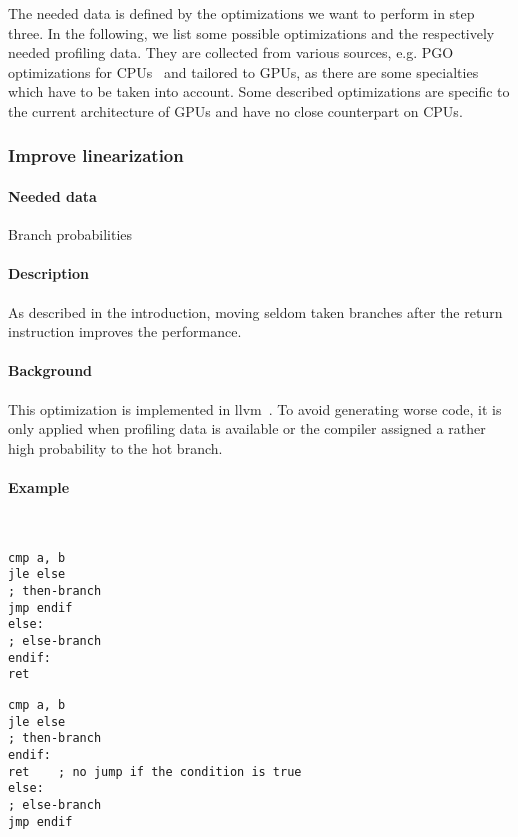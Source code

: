 The needed data is defined by the optimizations we want to perform in step three. In the following, we list some possible optimizations and the respectively needed profiling data. They are collected from various sources, e.g. PGO optimizations for CPUs~\cite{MicrosoftPgo} and tailored to GPUs, as there are some specialties which have to be taken into account. Some described optimizations are specific to the current architecture of GPUs and have no close counterpart on CPUs.

\subsubsection{Improve linearization}
\paragraph{Needed data} Branch probabilities
\paragraph{Description} As described in the introduction, moving seldom taken branches after the return instruction improves the performance.
\paragraph{Background} This optimization is implemented in llvm~\cite{llvmLinearization}. To avoid generating worse code, it is only applied when profiling data is available or the compiler assigned a rather high probability to the hot branch.
\paragraph{Example}\ \\%
\begin{minipage}{.47\textwidth}
\begin{lstlisting}[caption={Linearization -- unoptimized},frame=tlrb,language={[x86masm]Assembler}]
cmp a, b
jle else
; then-branch
jmp endif
else:
; else-branch
endif:
ret
\end{lstlisting}
\end{minipage}\hfill
\begin{minipage}{.47\textwidth}
\begin{lstlisting}[caption={Linearization -- optimized},frame=tlrb,language={[x86masm]Assembler}]
cmp a, b
jle else
; then-branch
endif:
ret    ; no jump if the condition is true
else:
; else-branch
jmp endif
\end{lstlisting}
\end{minipage}

